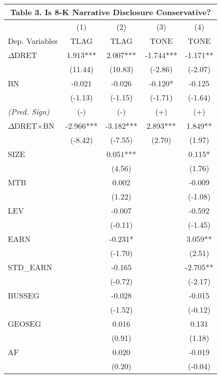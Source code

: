 \begin{table}[H] \label{T3}
	\begin{center}
		\tabcolsep=0.11cm
		\begin{tabular}{lcccc}
			\multicolumn{5}{c}{\textbf{Table 3. Is 8-K Narrative Disclosure Conservative?}} \\
			\toprule
			\toprule
			& (1) & (2) & (3) & (4) \\
			Dep. Variables & TLAG & TLAG & TONE & TONE \\
			\midrule
			$\Delta$DRET & 1.913*** & 2.007*** & -1.744*** & -1.171** \\
			& (11.44) & (10.83) & (-2.86) & (-2.07) \\
			BN & -0.021 & -0.026 & -0.120* & -0.125 \\
			& (-1.13) & (-1.15) & (-1.71) & (-1.64) \\
			\rowcolor[rgb]{ .906,  .902,  .902} \textit{(Pred. Sign)} & (-) & (-) & (+) & (+) \\
			\rowcolor[rgb]{ .906,  .902,  .902} $\Delta$DRET$\times$BN & -2.966*** & -3.182*** & 2.893*** & 1.849** \\
			\rowcolor[rgb]{ .906,  .902,  .902}   & (-8.42) & (-7.55) & (2.70) & (1.97) \\
			SIZE &   & 0.051*** &   & 0.115* \\
			&   & (4.56) &   & (1.76) \\
			MTB &   & 0.002 &   & -0.009 \\
			&   & (1.22) &   & (-1.08) \\
			LEV &   & -0.007 &   & -0.592 \\
			&   & (-0.11) &   & (-1.45) \\
			EARN &   & -0.231* &   & 3.059** \\
			&   & (-1.70) &   & (2.51) \\
			STD\_EARN &   & -0.165 &   & -2.705**\\
			&   & (-0.72) &   & (-2.17)\\
			BUSSEG &   & -0.028 &   & -0.015 \\
			&   & (-1.52) &   & (-0.12) \\
			GEOSEG &   & 0.016 &   & 0.131 \\
			&   & (0.91) &   & (1.18) \\
			AF &   & 0.020 &   & -0.019 \\
			&   & (0.20) &   & (-0.04)\\

\end{tabular}
\end{center}
\end{table}
